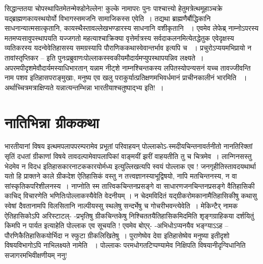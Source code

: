 सिद्धान्ततया चोपस्थापितमेतन्मेक्डोनेल्लेन! कुल्के  नामापरः पुनः पाश्चात्त्यो हेतुमत्रेत्थमूहाञ्चक्रे यद्ब्राह्मणकायस्थयोर्यो विभागस्समजनि सामाजिकस्स एवेति~। तद्यथा ब्राह्मणैर्बौद्धिकानि साधनान्यात्मसात्कृतानि, कायस्थैस्तावल्लेखभण्डारस्य  साधनानि वशीकृतानि ~। एवमेव लेफेब्र्  नाम्नोऽपरस्य मतमप्यसावुपस्थापयति यज्जगतो महत्याश्चाक्रिक्या वृत्तेर्मात्रस्य सर्वदाकलनमित्येतद्धेतुक एवेदृक्षस्य व्यतिकरस्य यदन्वेवेतिहासस्य समग्रस्यापि पौराणिककथास्वेवान्तर्भाव इत्यपि च ~। प्रचुरोऽप्ययमभिप्रायो न तावांस्तृप्तिकर – इति पुनःप्रब्रुवाणःपोल्लाकस्स्वकीयमौदार्यमप्युपस्थापयन्निव लक्ष्यते~। अपरमपीदृशमेवौदार्यमस्याधिभारतान् यन्नाम नीट्शे नाम्नश्चिन्तकस्य लपितस्योपन्यसनं यच्च तावज्जीवन्ति नाम पशव इतिहासपराङ्मुखाः, मनुष्य एव खलु पराकुर्यात्प्रतिक्षणमभिवर्धमानं प्राचीनकालीनं भारमिति ~। अर्थाच्चित्रमत्राक्षिप्यते यन्नात्यन्तम्भिन्ना भारतीयाश्चतुष्पाद्भ्य इति!~।

\newpage

\section*{नातिभिन्ना ग्रीककथा}

भारतीयानां विषय इत्थमपलापपरम्परामेव प्रभूतां परिवाहयन् पोल्लाकोऽ-स्मदीयचिन्तनावर्तनीतो नानतिरिक्तां सृतिं दधतां ग्रीकाणां विषये तावदल्पामेवापलापिकां वाङ्मयीं झरीं वाहयतीति तु च चित्रमेव~। लान्गिनसस्तु  भेदमेव न विदध इतिहासकारनाटककारयोर्मध्य इत्युल्लिखत्यपि स्वयं पोल्लाक एव ! जनगृहीतिस्तावदयथार्था यतो हि प्राक्तने काले ग्रीकदेश ऐतिहासिकं वस्तु न तत्त्वज्ञानस्याभूद्विषयो, नापि मतचिन्तनस्य, न वा सांस्कृतिकपरिशीलनस्य~। नाप्नोति स्म तात्त्विकचिन्तनप्रसङ्गे वा साधारणजनचिन्तनप्रसङ्गे वैतिहासिकी काचिद् विचारणेति भणितिःपोल्लाकस्यैवेति वेदनीयम् । न चेदमविदितं यद्ग्रीकरोमकानामैतिहासिकीषु कथासु स्वेषां दैवतानामपि विलसितानि नाल्पीयस्सु स्थलेषु सन्दर्भेषु च गोचरीभवन्त्येवेति~। मेकिन्टैर् नामक ऐतिहासिकोऽपि अरिस्टाटल्- -प्रभृतिषु ग्रीकचिन्तकेषु निश्चिततयैतिहासिकमिदमिति शृङ्गग्राहिकया दर्शयितुं किमपि न पार्यत इत्याहेति पोल्लाक एव सूचयति ! एवमेव बोएर्- -अभिधोऽप्यनयैव भङ्ग्याऽऽह – पौरणिकैतिहासिकयोर्भिदा न स्फुटा ग्रीकलिखितेषु~। पुराणेष्वेव देवा इतिहासेष्वेव मनुष्या इतीदृशो विषयविभागोऽपि नाभिलक्ष्यते नामेति ~। पोल्लाकः परमधोगतटिप्पण्यामेव निक्षिपति विषयानीदृग्विधानिति सजागरमभिवीक्षणीयम् ननु!


